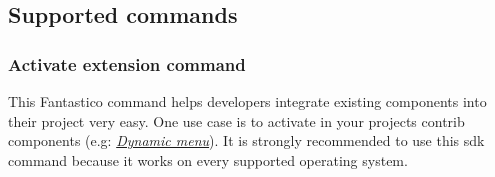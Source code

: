 \documentclass[letterpaper,10pt,english]{sphinxmanual}
\begin{document}
\subsection{Supported commands}
\label{features/sdk:supported-commands}

\subsubsection{Activate extension command}
\label{features/sdk/command_activate_extension::doc}\label{features/sdk/command_activate_extension:activate-extension-command}
This Fantastico command helps developers integrate existing components into their project very easy. One use case is to activate
in your projects contrib components (e.g: {\hyperref[features/components/dynamic_menu/dynamic_menu::doc]{\emph{Dynamic menu}}}). It
is strongly recommended to use this sdk command because it works on every supported operating system.
\end{document}
